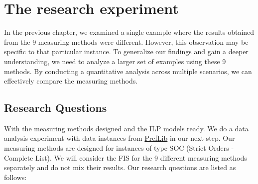 \documentclass{article}
\begin{document}
\section{The research experiment}
In the previous chapter, we examined a single example where the results obtained from the 9 measuring methods were different.  However, this observation may be specific to that particular instance. To generalize our findings and gain a deeper understanding, we need to analyze a larger set of examples using these 9 methods. By conducting a quantitative analysis across multiple scenarios, we can effectively compare the measuring methods.
\subsection{Research Questions}
With the measuring methods designed and the ILP models ready. We do a data analysis experiment with data instances from \href{https://www.preflib.org/}{PrefLib} in our next step. Our measuring methods are designed for instances of type SOC (Strict Orders - Complete List). We will consider the FIS for the 9 different measuring methods separately and do not mix their results. Our research questions are listed as follows:
\end{document}
